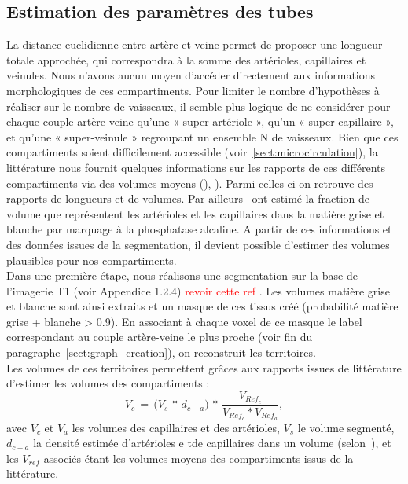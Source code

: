 \subsection{Estimation des paramètres des tubes}
La distance euclidienne entre artère et veine permet de proposer une longueur totale approchée, qui correspondra à la somme des artérioles, capillaires et veinules.  Nous n’avons aucun moyen d’accéder directement aux informations morphologiques de ces compartiments. Pour limiter le nombre d’hypothèses à réaliser sur le nombre de vaisseaux, il semble plus logique de ne considérer pour chaque couple artère-veine qu’une « super-artériole », qu’un « super-capillaire », et qu’une « super-veinule » regroupant un ensemble N de vaisseaux. Bien que ces compartiments soient difficilement accessible (voir~\ref{sect:microcirculation}), la littérature nous fournit quelques informations sur les rapports de ces différents compartiments via des volumes moyens (\cite{Zagzoule1986}), \cite{Linninger2009}). Parmi celles-ci on retrouve des rapports de longueurs et de volumes. Par ailleurs~\cite{Moody2004} ont estimé la fraction de volume que représentent les artérioles et les capillaires dans la matière grise et blanche par marquage à la phosphatase alcaline. A partir de ces informations et des données issues de la segmentation, il devient possible d’estimer des volumes plausibles pour nos compartiments.\\	
Dans une première étape, nous réalisons une segmentation sur la base de l’imagerie T1 (voir Appendice 1.2.4) \textcolor{red}{revoir cette ref} . Les volumes matière grise et blanche sont ainsi extraits et un masque de ces tissus créé (probabilité matière grise + blanche > 0.9). En associant à chaque voxel de ce masque le label correspondant au couple artère-veine le plus proche (voir fin du paragraphe~\ref{sect:graph_creation}), on reconstruit les territoires. \\
Les volumes de ces territoires permettent grâces aux rapports issues de littérature d’estimer les volumes des compartiments : 
\begin{equation}
\label{eq:volumesac}
V_{c}\,=\,\bigl(V_{s}\, *\,d_{c-a}\bigr)\, *\,\frac{V_{Ref_{c}}}{V_{Ref_{c}}*V_{Ref_{a}}},
\end{equation}
avec $V_c$ et $V_a$  les volumes des capillaires et des artérioles, $V_s$ le volume segmenté, $d_{c-a}$ la densité estimée d'artérioles e tde capillaires dans un volume (selon~\cite{Moody2004}), et les $V_{ref}$ associés étant les volumes moyens des compartiments issus de la littérature.\\
